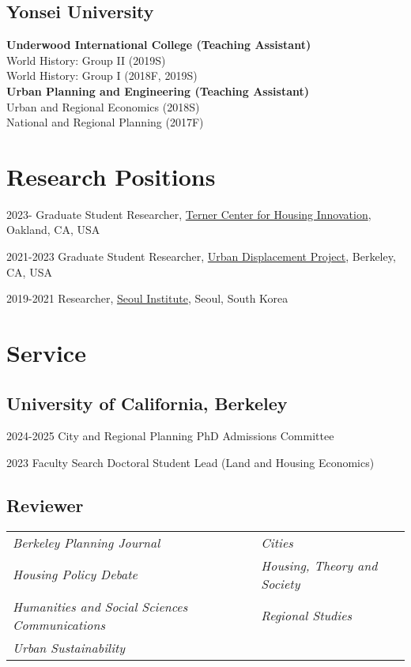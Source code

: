 \documentclass[11pt,letterpaper]{report}
\begin{document}
\subsection*{Yonsei University}
\textbf{Underwood International College (Teaching Assistant)}\\[0.3em]
World History: Group II (2019S)\\
World History: Group I  (2018F, 2019S)\\[0.7em]
\textbf{Urban Planning and Engineering (Teaching Assistant)}\\[0.3em]
Urban and Regional Economics (2018S)\\
National and Regional Planning (2017F)

\section*{Research Positions}
\begin{tablist}
\item[2023-] \tab{}Graduate Student Researcher, \href{https://ternercenter.berkeley.edu/}{Terner Center for Housing Innovation}, Oakland, CA, USA
\item[2021-2023] \tab{}Graduate Student Researcher, \href{https://www.urbandisplacement.org/}{Urban Displacement Project}, Berkeley, CA, USA
\item[2019-2021] \tab{}Researcher, \href{si.re.kr}{Seoul Institute}, Seoul, South Korea
\end{tablist}

\section*{Service}
\subsection*{University of California, Berkeley}
\begin{tablist}
\item[2024-2025] \tab{}City and Regional Planning PhD Admissions Committee
\item[2023] \tab{}Faculty Search Doctoral Student Lead (Land and Housing Economics)
\end{tablist}
\subsection*{Reviewer}
\begin{tabular}{@{}p{} p{}@{}}
\emph{Berkeley Planning Journal} & \emph{Cities}\\
\emph{Housing Policy Debate} & \emph{Housing, Theory and Society}\\
\emph{Humanities and Social Sciences Communications} & \emph{Regional Studies}\\
\emph{Urban Sustainability}
\end{tabular}
\end{document}

